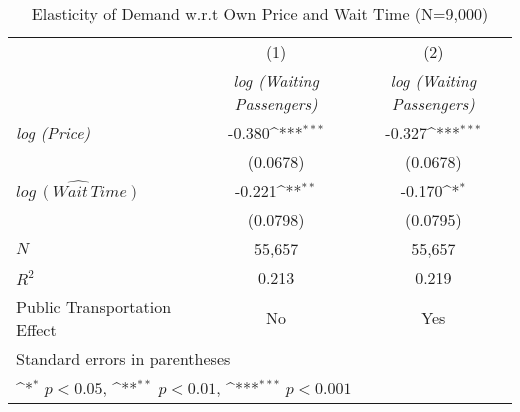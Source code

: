 
\begin{table}[h]
\caption{Elasticity of Demand w.r.t Own Price and Wait Time (N=9,000)}\label{tab:robust_9000}\\

{
\def\sym#1{\ifmmode^{#1}\else\(^{#1}\)\fi}
\begin{center}
\begin{tabular}{l*{2}{c}}
\hline\hline
            &\multicolumn{1}{c}{(1)}&\multicolumn{1}{c}{(2)}\\
            &\multicolumn{1}{c}{\textit{log (Waiting Passengers)}}&\multicolumn{1}{c}{\textit{log (Waiting Passengers)}}\\
\hline
\textit{log (Price)}      &      -0.380\sym{***}&      -0.327\sym{***}\\
            &    (0.0678)         &    (0.0678)         \\
[1em]
${\widehat{log\, (Wait\, Time)}}$&      -0.221\sym{**} &     -0.170\sym{*}  \\
            &    (0.0798)         &    (0.0795)         \\
\hline
\(N\)       &       55,657         &       55,657         \\
\(R^{2}\)   &       0.213         &       0.219         \\
Public Transportation Effect &       No            &    Yes                 \\
\hline\hline
\multicolumn{3}{l}{\footnotesize Standard errors in parentheses}\\
\multicolumn{3}{l}{\footnotesize \sym{*} \(p<0.05\), \sym{**} \(p<0.01\), \sym{***} \(p<0.001\)}\\
\end{tabular}
\end{center}
}


\end{table}
